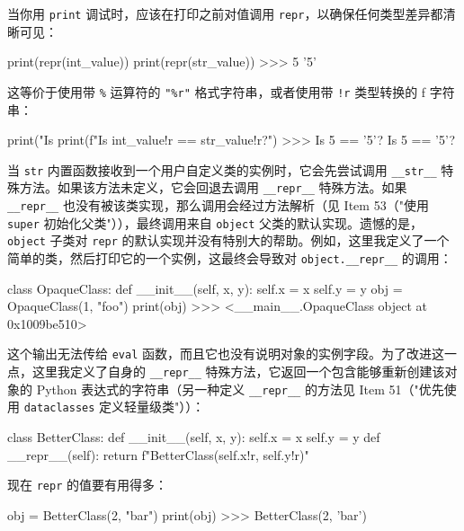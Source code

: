 当你用 \texttt{print} 调试时，应该在打印之前对值调用 \texttt{repr}，以确保任何类型差异都清晰可见：

\begin{codebox}[python]
print(repr(int_value))
print(repr(str_value))
>>>
5
'5'
\end{codebox}

这等价于使用带 \texttt{\%} 运算符的 \texttt{"\%r"} 格式字符串，或者使用带 \texttt{!r} 类型转换的 f 字符串：

\begin{codebox}[python]
print("Is %
print(f"Is {int_value!r} == {str_value!r}?")
>>>
Is 5 == '5'?
Is 5 == '5'?
\end{codebox}

当 \texttt{str} 内置函数接收到一个用户自定义类的实例时，它会先尝试调用 \texttt{\_\_str\_\_} 特殊方法。如果该方法未定义，它会回退去调用 \texttt{\_\_repr\_\_} 特殊方法。如果 \texttt{\_\_repr\_\_} 也没有被该类实现，那么调用会经过方法解析（见 Item 53（"使用 \texttt{super} 初始化父类"）），最终调用来自 \texttt{object} 父类的默认实现。遗憾的是，\texttt{object} 子类对 \texttt{repr} 的默认实现并没有特别大的帮助。例如，这里我定义了一个简单的类，然后打印它的一个实例，这最终会导致对 \texttt{object.\_\_repr\_\_} 的调用：

\begin{codebox}[python]
class OpaqueClass:
    def __init__(self, x, y):
        self.x = x
        self.y = y
obj = OpaqueClass(1, "foo")
print(obj)
>>>
<__main__.OpaqueClass object at 0x1009be510>
\end{codebox}

这个输出无法传给 \texttt{eval} 函数，而且它也没有说明对象的实例字段。为了改进这一点，这里我定义了自身的 \texttt{\_\_repr\_\_} 特殊方法，它返回一个包含能够重新创建该对象的 Python 表达式的字符串（另一种定义 \texttt{\_\_repr\_\_} 的方法见 Item 51（"优先使用 \texttt{dataclasses} 定义轻量级类"））：

\begin{codebox}[python]
class BetterClass:
    def __init__(self, x, y):
        self.x = x
        self.y = y
    def __repr__(self):
        return f"BetterClass({self.x!r}, {self.y!r})"
\end{codebox}

现在 \texttt{repr} 的值要有用得多：

\begin{codebox}[python]
obj = BetterClass(2, "bar")
print(obj)
>>>
BetterClass(2, 'bar')
\end{codebox}

